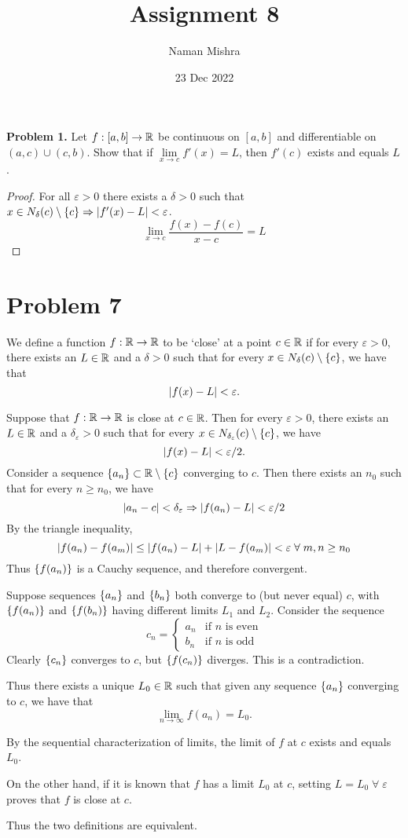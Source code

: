 \documentclass[12pt]{article}
\title{Assignment 8}
\author{Naman Mishra}
\date{23 Dec 2022}
\begin{document}
\maketitle

\textbf{Problem 1.}
Let $f : [a, b] \to \mathbb{R}$ be continuous on $[a, b]$ and differentiable on $(a, c) \cup (c, b)$. Show that if $\lim\limits_{x \to c} f'(x) = L$, then $f'(c)$ exists and equals $L$.

\begin{proof}
    For all $\varepsilon > 0$ there exists a $\delta > 0$ such that $x \in N_{\delta}(c) \setminus \set{c} \implies \abs{ f'(x) - L } < \varepsilon$. \[
        \lim_{x \to c} \frac{f(x) - f(c)}{x - c} = L
    \]
\end{proof}

\section*{Problem 7}
We define a function $f : \mathbb{R} \to \mathbb{R}$ to be `close' at a point $c \in \mathbb{R}$ if for every $\varepsilon > 0$, there exists an $L \in \mathbb{R}$ and a $\delta > 0$ such that for every $x \in N_{\delta}(c) \setminus \set{c}$, we have that \[
    \abs{ f(x) - L } < \varepsilon.
\]

Suppose that $f : \mathbb{R} \to \mathbb{R}$ is close at $c \in \mathbb{R}$.
Then for every $\varepsilon > 0$, there exists an $L \in \mathbb{R}$ and a $\delta_{\varepsilon} > 0$ such that for every $x \in N_{\delta_{\varepsilon}}(c) \setminus \set{c}$, we have \[
    \abs{ f(x) - L } < \varepsilon / 2.
\]
Consider a sequence $\set{a_{n}} \subset \R \setminus \set{c}$ converging to $c$.
Then there exists an $n_{0}$ such that for every $n \geq n_{0}$, we have \[
    \abs{ a_{n} - c } < \delta_{\varepsilon} \implies \abs{ f(a_{n}) - L } < \varepsilon / 2
\] By the triangle inequality, \[
    \abs{ f(a_{n}) - f(a_{m}) } \leq \abs{ f(a_{n}) - L } + \abs{ L - f(a_{m}) } < \varepsilon \;\forall\; m, n \geq n_{0}
\] Thus $\set{f(a_{n})}$ is a Cauchy sequence, and therefore convergent.

Suppose sequences $\set{a_{n}}$ and $\set{b_{n}}$ both converge to (but never equal) $c$, with $\set{f(a_{n})}$ and $\set{f(b_{n})}$ having different limits $L_{1}$ and $L_{2}$. Consider the sequence \[
    c_{n} = \begin{cases}
        a_{n} & \text{if } n \text{ is even} \\
        b_{n} & \text{if } n \text{ is odd}
    \end{cases}
\] Clearly $\set{c_{n}}$ converges to $c$, but $\set{f(c_{n})}$ diverges. This is a contradiction.

Thus there exists a unique $L_{0} \in \mathbb{R}$ such that given any sequence $\set{a_{n}}$ converging to $c$, we have that \[
    \lim_{n \to \infty} f(a_{n}) = L_{0}.
\]

By the sequential characterization of limits, the limit of $f$ at $c$ exists and equals $L_{0}$.

On the other hand, if it is known that $f$ has a limit $L_{0}$ at $c$, setting $L = L_{0} \;\forall\; \varepsilon$ proves that $f$ is close at $c$.

Thus the two definitions are equivalent.
\end{document}
